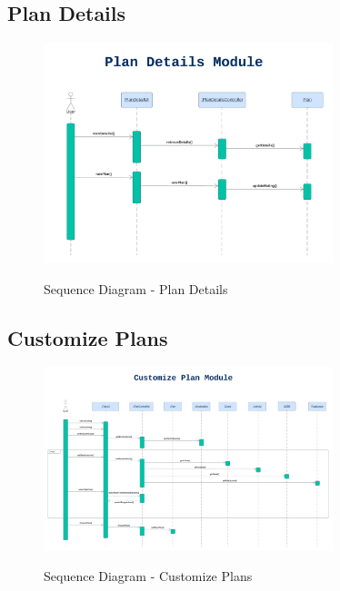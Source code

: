 \documentclass[12pt]{article}
\begin{document}
\subsection{Plan Details}
\begin{figure}[H]
    \centering
        \includegraphics[width=0.75\textwidth]{Sequence Diagram/PlanDetails.png}
        \label{fig:SeqPlanDetails}
    \caption{Sequence Diagram - Plan Details}
\end{figure}

\newpage
\subsection{Customize Plans}
\begin{figure}[H]
    \centering
        \includegraphics[width=0.75\textwidth]{Sequence Diagram/CustomizePlan.png}
        \label{fig:SeqCustPlan}
    \caption{Sequence Diagram - Customize Plans}
\end{figure}
\end{document}
